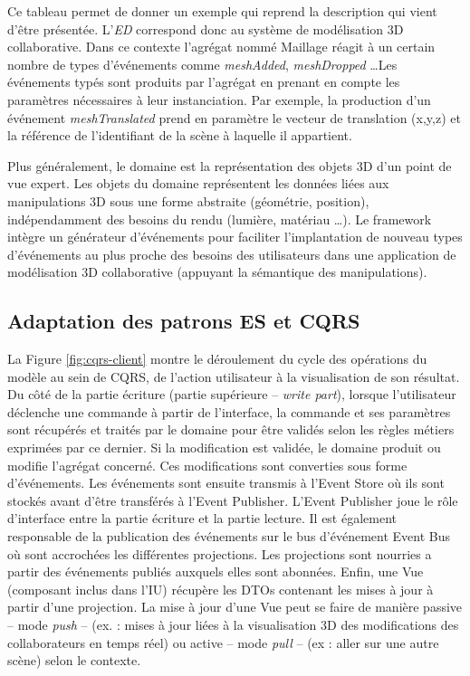Ce tableau permet de donner un exemple qui reprend la description qui vient d'être 
présentée. L'\textit{ED} correspond donc au \og système de modélisation 3D 
collaborative\fg{}. Dans ce contexte l'agrégat nommé \og Maillage\fg{} réagit à un 
certain nombre de types d'événements comme \textit{meshAdded}, 
\textit{meshDropped} \dots Les événements typés sont produits par l'agrégat en 
prenant en compte les paramètres nécessaires à leur instanciation. Par exemple, 
la production d'un événement \textit{meshTranslated} prend en paramètre le 
vecteur de translation (x,y,z) et la référence de l'identifiant de la scène à laquelle il 
appartient.


Plus généralement, le domaine est la représentation des objets 3D d'un point de 
vue expert. Les objets du domaine représentent les données liées aux 
manipulations 3D sous une forme abstraite (géométrie, position), indépendamment
des besoins du rendu (lumière, matériau \dots). Le framework intègre un 
générateur d'événements pour faciliter l'implantation de nouveau types 
d'événements au plus proche des besoins des utilisateurs dans une application de 
modélisation 3D collaborative (appuyant la sémantique des manipulations).





\subsection{Adaptation des patrons \gls{ES} et \gls{CQRS}}


La Figure \ref{fig:cqrs-client} montre le déroulement du cycle des opérations du 
modèle au sein de \gls{CQRS}, de l'action utilisateur à la visualisation de son 
résultat. 
Du côté de la partie écriture (partie supérieure -- \textit{write part}), lorsque 
l'utilisateur déclenche une commande à partir de l'interface, la commande et ses 
paramètres sont récupérés et traités par le domaine pour être validés selon les 
règles métiers exprimées par ce dernier. Si la modification est validée, le domaine 
produit ou modifie l'agrégat concerné. Ces modifications sont converties sous 
forme d'événements. Les événements sont ensuite transmis à l'Event Store où ils 
sont stockés 
avant d'être transférés à l'Event Publisher. L'Event Publisher joue le rôle 
d'interface entre la partie écriture et la partie lecture. 
Il est également responsable de la 
publication des événements sur le bus d'événement Event Bus où sont 
accrochées les différentes projections. Les projections sont nourries a partir des 
événements publiés auxquels elles sont abonnées. Enfin, une Vue (composant
inclus dans l'\gls{IU}) récupère les \glspl{DTO}
contenant les mises à jour à partir d'une projection. La mise à jour d'une Vue peut 
se faire de manière passive -- mode \textit{push} -- (ex. : mises à jour liées à la 
visualisation 3D des modifications des collaborateurs en temps réel) ou active -- 
mode \textit{pull} -- (ex : aller sur une autre scène) selon le contexte.

